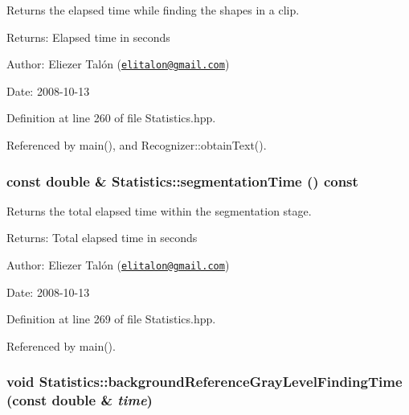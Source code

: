 Returns the elapsed time while finding the shapes in a clip. 

\begin{Desc}
\item[Returns:]Elapsed time in seconds\end{Desc}
\begin{Desc}
\item[Author:]Eliezer Talón (\href{mailto:elitalon@gmail.com}{\tt elitalon@gmail.com}) \end{Desc}
\begin{Desc}
\item[Date:]2008-10-13 \end{Desc}


Definition at line 260 of file Statistics.hpp.

Referenced by main(), and Recognizer::obtainText().\hypertarget{class_statistics_f4c992e9970bce97b9a33100db689739}{
\subsubsection[segmentationTime]{\setlength{\rightskip}{0pt plus 5cm}const double \& Statistics::segmentationTime () const}}
\label{class_statistics_f4c992e9970bce97b9a33100db689739}


Returns the total elapsed time within the segmentation stage. 

\begin{Desc}
\item[Returns:]Total elapsed time in seconds\end{Desc}
\begin{Desc}
\item[Author:]Eliezer Talón (\href{mailto:elitalon@gmail.com}{\tt elitalon@gmail.com}) \end{Desc}
\begin{Desc}
\item[Date:]2008-10-13 \end{Desc}


Definition at line 269 of file Statistics.hpp.

Referenced by main().\hypertarget{class_statistics_f8a60e8a89be8fe8b2c46782681c1a2c}{
\subsubsection[backgroundReferenceGrayLevelFindingTime]{\setlength{\rightskip}{0pt plus 5cm}void Statistics::backgroundReferenceGrayLevelFindingTime (const double \& {\em time})}}
\label{class_statistics_f8a60e8a89be8fe8b2c46782681c1a2c}


